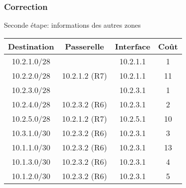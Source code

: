 \documentclass[svgnames,11pt]{beamer}
\begin{document}
\begin{frame}
    \frametitle{Correction}
    Seconde étape: informations des autres zones
    \begin{center}
        \begin{tabular}{|*{4}{c|}}
            \hline
            Destination & Passerelle    & Interface & Coût \\
            \hline
            10.2.1.0/28 &               & 10.2.1.1  & 1    \\
            \hline
            10.2.2.0/28 & 10.2.1.2 (R7) & 10.2.1.1  & 11    \\
            \hline
            10.2.3.0/28 &               & 10.2.3.1  & 1   \\
            \hline
            10.2.4.0/28 & 10.2.3.2 (R6) & 10.2.3.1  & 2    \\
            \hline
            10.2.5.0/28 & 10.2.1.2 (R7) & 10.2.5.1  & 10    \\
            \hline
            10.3.1.0/30 & 10.2.3.2 (R6) & 10.2.3.1  & 3    \\
            \hline
            10.1.1.0/30 & 10.2.3.2 (R6) & 10.2.3.1  & 13    \\
            \hline
            10.1.3.0/30 & 10.2.3.2 (R6) & 10.2.3.1  & 4    \\
            \hline
            10.1.2.0/30 & 10.2.3.2 (R6) & 10.2.3.1  & 5    \\
            \hline
        \end{tabular}
    \end{center}

\end{frame}
\end{document}
